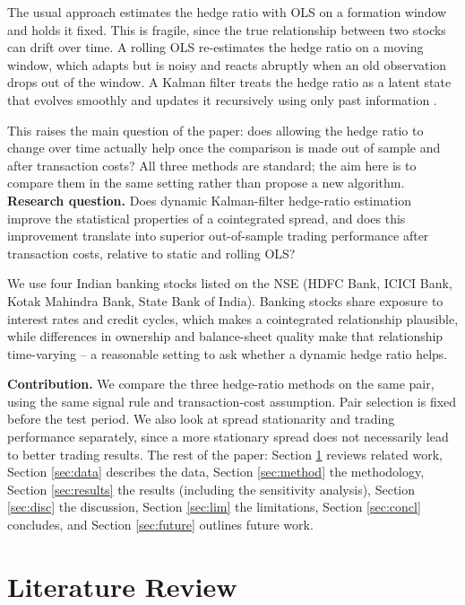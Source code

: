 \documentclass[11pt,a4paper]{article}
\begin{document}
The usual approach estimates the hedge ratio with OLS on a formation window and holds it fixed. This is fragile, since the true relationship between two stocks can drift over time. A rolling OLS re-estimates the hedge ratio on a moving window, which adapts but is noisy and reacts abruptly when an old observation drops out of the window. A Kalman filter treats the hedge ratio as a latent state that evolves smoothly and updates it recursively using only past information \citep{kalman1960new,elliott2005pairs}.

This raises the main question of the paper: does allowing the hedge ratio to change over time actually help once the comparison is made out of sample and after transaction costs? All three methods are standard; the aim here is to compare them in the same setting rather than propose a new algorithm.
\textbf{Research question.} Does dynamic Kalman-filter hedge-ratio estimation improve the statistical properties of a cointegrated spread, and does this improvement translate into superior out-of-sample trading performance after transaction costs, relative to static and rolling OLS?

We use four Indian banking stocks listed on the NSE (HDFC Bank, ICICI Bank, Kotak Mahindra Bank, State Bank of India). Banking stocks share exposure to interest rates and credit cycles, which makes a cointegrated relationship plausible, while differences in ownership and balance-sheet quality make that relationship time-varying -- a reasonable setting to ask whether a dynamic hedge ratio helps.

\textbf{Contribution.} We compare the three hedge-ratio methods on the same pair, using the same signal rule and transaction-cost assumption. Pair selection is fixed before the test period. We also look at spread stationarity and trading performance separately, since a more stationary spread does not necessarily lead to better trading results.
The rest of the paper: Section \ref{sec:lit} reviews related work, Section \ref{sec:data} describes the data, Section \ref{sec:method} the methodology, Section \ref{sec:results} the results (including the sensitivity analysis), Section \ref{sec:disc} the discussion, Section \ref{sec:lim} the limitations, Section \ref{sec:concl} concludes, and Section \ref{sec:future} outlines future work.

\section{Literature Review}\label{sec:lit}
\end{document}
